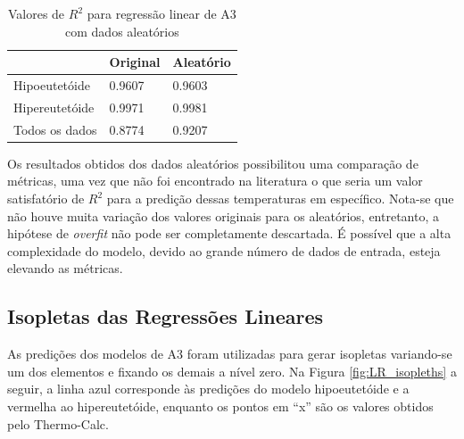 \documentclass[brazil,tf,epusp]{usp}  %
\begin{document}
\begin{table}
  \caption{Valores de $R^{2}$ para regressão linear de A3 com dados aleatórios}

  \begin{tabular}{lll}
  \hline
                 & Original & Aleatório \\
  \hline
  Hipoeutetóide  & 0.9607   & 0.9603    \\
  Hipereutetóide & 0.9971   & 0.9981    \\
  Todos os dados & 0.8774   & 0.9207    \\
  \hline
  \end{tabular}

  \label{tab:r2_A3_RL_random}
\end{table}

Os resultados obtidos dos dados aleatórios possibilitou uma comparação de métricas, uma vez que não foi encontrado na literatura o que seria um valor satisfatório de $R^{2}$ para a predição dessas temperaturas em específico. Nota-se que não houve muita variação dos valores originais para os aleatórios, entretanto, a hipótese de \textit{overfit} não pode ser completamente descartada. É possível que a alta complexidade do modelo, devido ao grande número de dados de entrada, esteja elevando as métricas.

\subsection{Isopletas das Regressões Lineares}

As predições dos modelos de A3 foram utilizadas para gerar isopletas variando-se um dos elementos e fixando os demais a nível zero. Na Figura \ref{fig:LR_isopleths} a seguir, a linha azul corresponde às predições do modelo hipoeutetóide e a vermelha ao hipereutetóide, enquanto os pontos em ``x'' são os valores obtidos pelo Thermo-Calc\textregistered{}.
\end{document}
